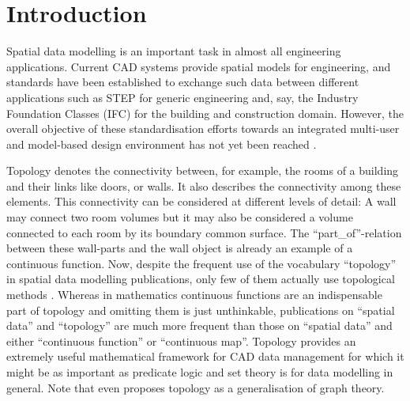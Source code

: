 \documentclass[5p]{elsarticle}
\newcommand{\qq}[1]{``#1''}
\begin{document}
\section{Introduction}\label{sec:intro}

Spatial data modelling is an important task in almost all engineering applications. 
Current CAD systems provide spatial models for engineering, and standards have been 
established to exchange such data between different applications such as STEP for generic 
engineering and, say, the Industry Foundation Classes (IFC) \cite{IFC2x3} for the building 
and construction domain. 
However, the overall objective of these standardisation efforts towards an integrated 
multi-user and model-based design environment has not yet been reached \cite{Nepal2012904}. 

Topology denotes the connectivity between, for example, the rooms of a building and their 
links like doors, or walls. 
It also describes the connectivity among these elements. 
This connectivity can be considered at different levels of detail: 
A wall may connect two room volumes but it may also be considered a volume connected to 
each room by its boundary common surface. 
The \qq{part\_of}-relation between these wall-parts and the wall object is already 
an example of a continuous function.
Now, despite the frequent use of the vocabulary \qq{topology} in spatial data modelling 
publications, only few of them actually use topological methods 
\cite{Boltcheva:Homology,Raghothama:CRT}. 
Whereas in mathematics continuous functions are an indispensable part of topology and omitting 
them is just unthinkable, publications on \qq{spatial data} and \qq{topology} are much more 
frequent than those on \qq{spatial data} and either \qq{continuous function} or \qq{continuous map}.
Topology provides an extremely useful mathematical framework for CAD data management 
for which it might be as important as predicate logic and set theory is for data 
modelling in general. Note that \cite{Vella:GraphTheoryIsTopology} even proposes topology as a 
generalisation of graph theory. 
\end{document}
